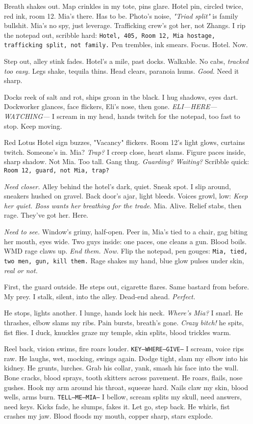 \documentclass[12pt,oneside]{book}
\newcommand{\note}[1]{\texttt{#1}}
\begin{document}
Breath shakes out. Map crinkles in my tote, pins glare. Hotel pin, circled twice, red ink, room 12. Mia’s there. Has to be. Photo’s noise, \textit{"Triad split"} is family bullshit. Mia’s no spy, just leverage. Trafficking crew’s got her, not Zhangs. I rip the notepad out, scribble hard: \note{Hotel, 405, Room 12, Mia hostage, trafficking split, not family.} Pen trembles, ink smears. Focus. Hotel. Now.

Step out, alley stink fades. Hotel’s a mile, past docks. Walkable. No cabs, \textit{tracked too easy.} Legs shake, tequila thins. Head clears, paranoia hums. \textit{Good.} Need it sharp.

Docks reek of salt and rot, ships groan in the black. I hug shadows, eyes dart. Dockworker glances, face flickers, \textnormal{Eli}’s nose, then gone. \textit{ELI—HERE—WATCHING—} I scream in my head, hands twitch for the notepad, too fast to stop. Keep moving.

Red Lotus Hotel sign buzzes, "Vacancy" flickers. Room 12’s light glows, curtains twitch. Someone’s in. Mia? \textit{Trap?} I creep close, heart slams. Figure paces inside, sharp shadow. Not Mia. Too tall. Gang thug. \textit{Guarding? Waiting?} Scribble quick: \note{Room 12, guard, not Mia, trap?}

\textit{Need closer.} Alley behind the hotel’s dark, quiet. Sneak spot. I slip around, sneakers hushed on gravel. Back door’s ajar, light bleeds. Voices growl, low: \textit{Keep her quiet. Boss wants her breathing for the trade}. Mia. Alive. Relief stabs, then rage. They’ve got her. Here.

\textit{Need to see.} Window’s grimy, half-open. Peer in, Mia’s tied to a chair, gag biting her mouth, eyes wide. Two guys inside: one paces, one cleans a gun. Blood boils. WMD rage claws up. \textit{End them. Now.} Flip the notepad, pen gouges: \note{Mia, tied, two men, gun, kill them.} Rage shakes my hand, blue glow pulses under skin, \textit{real or not.}

First, the guard outside. He steps out, cigarette flares. Same bastard from before. My prey. I stalk, silent, into the alley. Dead-end ahead. \textit{Perfect.}

He stops, lights another. I lunge, hands lock his neck. \textit{Where’s Mia?} I snarl. He thrashes, elbow slams my ribs. Pain bursts, breath’s gone. \textit{Crazy bitch!} he spits, fist flies. I duck, knuckles graze my temple, skin splits, blood trickles warm.

Reel back, vision swims, fire roars louder. \note{KEY—WHERE—GIVE—} I scream, voice rips raw. He laughs, wet, mocking, swings again. Dodge tight, slam my elbow into his kidney. He grunts, lurches. Grab his collar, yank, smash his face into the wall. Bone cracks, blood sprays, tooth skitters across pavement. He roars, flails, nose gushes. Hook my arm around his throat, squeeze hard. Nails claw my skin, blood wells, arms burn. \note{TELL—ME—MIA—} I bellow, scream splits my skull, need answers, need keys. Kicks fade, he slumps, fakes it. Let go, step back. He whirls, fist crashes my jaw. Blood floods my mouth, copper sharp, stars explode.
\end{document}
